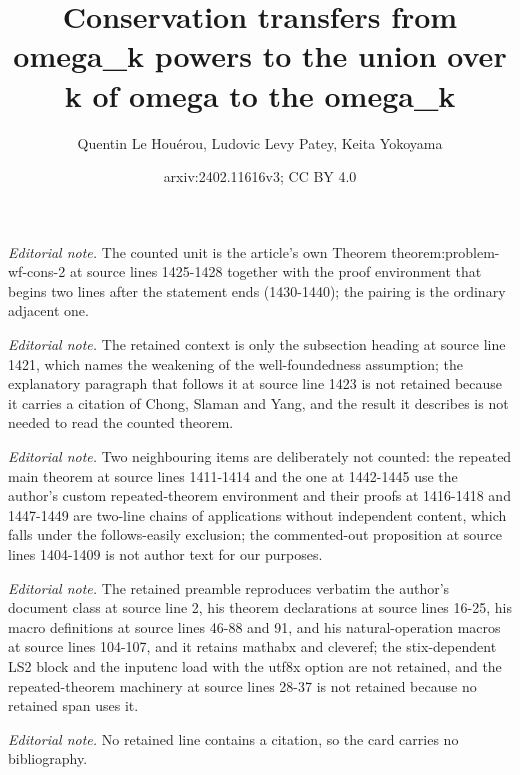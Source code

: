 \documentclass{article}
\title{Conservation transfers from omega\_k powers to the union over k of omega to the omega\_k}
\author{Quentin Le Houérou, Ludovic Levy Patey, Keita Yokoyama}
\date{arxiv:2402.11616v3; CC BY 4.0}
\numberwithin{theorem}{section}
\begin{document}
\maketitle
\noindent\textit{Editorial note.} The counted unit is the article's own Theorem theorem:problem-wf-cons-2 at source lines 1425-1428 together with the proof environment that begins two lines after the statement ends (1430-1440); the pairing is the ordinary adjacent one.\par\medskip
\noindent\textit{Editorial note.} The retained context is only the subsection heading at source line 1421, which names the weakening of the well-foundedness assumption; the explanatory paragraph that follows it at source line 1423 is not retained because it carries a citation of Chong, Slaman and Yang, and the result it describes is not needed to read the counted theorem.\par\medskip
\noindent\textit{Editorial note.} Two neighbouring items are deliberately not counted: the repeated main theorem at source lines 1411-1414 and the one at 1442-1445 use the author's custom repeated-theorem environment and their proofs at 1416-1418 and 1447-1449 are two-line chains of applications without independent content, which falls under the follows-easily exclusion; the commented-out proposition at source lines 1404-1409 is not author text for our purposes.\par\medskip
\noindent\textit{Editorial note.} The retained preamble reproduces verbatim the author's document class at source line 2, his theorem declarations at source lines 16-25, his macro definitions at source lines 46-88 and 91, and his natural-operation macros at source lines 104-107, and it retains mathabx and cleveref; the stix-dependent LS2 block and the inputenc load with the utf8x option are not retained, and the repeated-theorem machinery at source lines 28-37 is not retained because no retained span uses it.\par\medskip
\noindent\textit{Editorial note.} No retained line contains a citation, so the card carries no bibliography.\par\medskip
\end{document}
